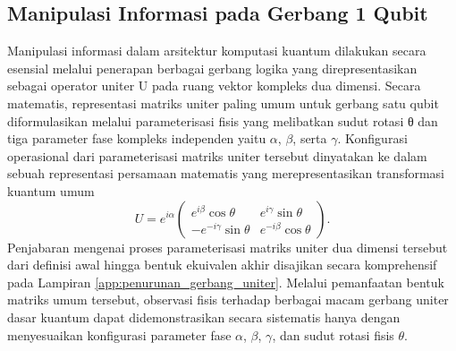 \subsection{Manipulasi Informasi pada Gerbang 1 Qubit}
Manipulasi informasi dalam arsitektur komputasi kuantum dilakukan secara esensial melalui penerapan berbagai gerbang logika yang direpresentasikan sebagai operator uniter U pada ruang vektor kompleks dua dimensi. Secara matematis, representasi matriks uniter paling umum untuk gerbang satu qubit diformulasikan melalui parameterisasi fisis yang melibatkan sudut rotasi θ dan tiga parameter fase kompleks independen yaitu $\alpha$, $\beta$, serta $\gamma$. Konfigurasi operasional dari parameterisasi matriks uniter tersebut dinyatakan ke dalam sebuah representasi persamaan matematis yang merepresentasikan transformasi kuantum umum
\begin{equation}
\label{eq:unitary_general}
U = e^{i\alpha} \begin{pmatrix} e^{i\beta}\cos\theta & e^{i\gamma}\sin\theta \\ -e^{-i\gamma}\sin\theta & e^{-i\beta}\cos\theta \end{pmatrix}.
\end{equation}
Penjabaran mengenai proses parameterisasi matriks uniter dua dimensi tersebut dari definisi awal hingga bentuk ekuivalen akhir disajikan secara komprehensif pada Lampiran \ref{app:penurunan_gerbang_uniter}. Melalui pemanfaatan bentuk matriks umum tersebut, observasi fisis terhadap berbagai macam gerbang uniter dasar kuantum dapat didemonstrasikan secara sistematis hanya dengan menyesuaikan konfigurasi parameter fase $\alpha$, $\beta$, $\gamma$, dan
sudut rotasi fisis $\theta$.

